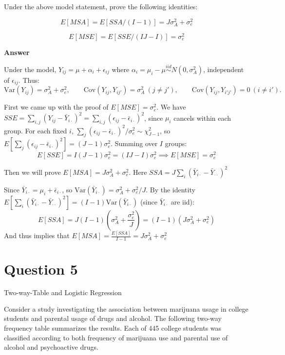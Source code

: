 \documentclass[letterpaper]{article}
\begin{document}
	Under the above model statement, prove the following identities:
	
	\[
	E[MSA] = E[SSA/(I-1)] = J\sigma^2_A + \sigma^2_e
	\]
	
	\[
	E[MSE] = E[SSE/(IJ-I)] = \sigma^2_e
	\]
	
	\textbf{Answer}
	
	Under the model, $Y_{ij} = \mu + \alpha_i + \epsilon_{ij}$ where $\alpha_i = \mu_i - \mu \overset{iid}{\sim} N(0,\sigma^2_A)$, independent of $\epsilon_{ij}$. Thus:
	$$\text{Var}(Y_{ij}) = \sigma^2_A + \sigma^2_e, \qquad \text{Cov}(Y_{ij}, Y_{ij'}) = \sigma^2_A \ (j \neq j'), \qquad \text{Cov}(Y_{ij}, Y_{i'j'}) = 0 \ (i \neq i').$$
	
	First we came up with the {proof of }$E[MSE] = \sigma^2_e$.
	We have $SSE = \sum_{i,j}(Y_{ij} - \bar{Y}_{i\cdot})^2 = \sum_{i,j}(\epsilon_{ij} - \bar{\epsilon}_{i\cdot})^2$, 
	since $\mu_i$ cancels within each group. For each fixed $i$, $\sum_j(\epsilon_{ij}-\bar{\epsilon}_{i\cdot})^2/\sigma^2_e \sim \chi^2_{J-1}$, so $E[\sum_j(\epsilon_{ij}-\bar{\epsilon}_{i\cdot})^2] = (J-1)\sigma^2_e$. Summing over $I$ groups:
	$$E[SSE] = I(J-1)\sigma^2_e = (IJ - I)\sigma^2_e \implies {E[MSE] = \sigma^2_e}$$
	
	Then we will prove $E[MSA] = J\sigma^2_A + \sigma^2_e$. Here $SSA = J\sum_{i}(\bar{Y}_{i\cdot} - \bar{Y}_{\cdot\cdot})^2$
	
	Since $\bar{Y}_{i\cdot} = \mu_i + \bar{\epsilon}_{i\cdot}$, so $\text{Var}(\bar{Y}_{i\cdot}) = \sigma^2_A + \sigma^2_e/J$. By the identity $E[\sum_i(\bar{Y}_{i\cdot}-\bar{Y}_{\cdot\cdot})^2] = (I-1)\text{Var}(\bar{Y}_{i\cdot})$ (since $\bar{Y}_{i\cdot}$ are iid):
	$$E[SSA] = J(I-1)\left(\sigma^2_A + \frac{\sigma^2_e}{J}\right) = (I-1)(J\sigma^2_A + \sigma^2_e)$$ 
	And thus implies that
	$ {E[MSA] = \frac{E[SSA]}{I-1} = J\sigma^2_A + \sigma^2_e}$
	
	\clearpage
	
	\section{Question 5}
	
	{\color{deepred}  Two-way-Table and Logistic Regression}
	
	Consider a study investigating the association between marijuana usage in college students and parental usage of drugs and alcohol. The following two-way frequency table summarizes the results. Each of 445 college students was classified according to both frequency of marijuana use and parental use of alcohol and psychoactive drugs.
	
\end{document}
